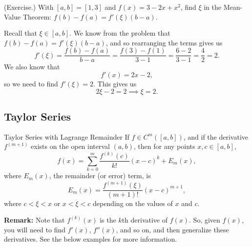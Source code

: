 \documentclass[letterpaper]{article}
\begin{document}
\begin{mdframed}
    (Exercise.) With $[a, b] = [1, 3]$ and $f(x) = 3 - 2x + x^2$, find $\xi$ in the Mean-Value Theorem: $f(b) - f(a) = f'(\xi) (b - a)$. 

    \begin{mdframed}
        Recall that $\xi \in [a, b]$. We know from the problem that $f(b) - f(a) = f'(\xi) (b - a)$, and so rearranging the terms gives us 
        \[f'(\xi) = \frac{f(b) - f(a)}{b - a} = \frac{f(3) - f(1)}{3 - 1} = \frac{6 - 2}{3 - 1} = \frac{4}{2} = 2.\] We also know that \[f'(x) = 2x - 2,\] so we need to find $f'(\xi) = 2$. This gives us \[2\xi - 2 = 2 \implies \xi = 2.\]
    \end{mdframed}
\end{mdframed}

\subsection{Taylor Series}
\begin{theorem}{Taylor Series with Lagrange Remainder}{}
    If $f \in C^m ([a, b])$, and if the derivative $f^{(m + 1)}$ exists on the open interval $(a, b)$, then for any points $x, c \in [a, b]$, 
    \[f(x) = \sum_{k = 0}^{m} \frac{f^{(k)} (c)}{k!} (x - c)^k + E_{m}(x),\] 
    where $E_{m}(x)$, the remainder (or error) term, is  
    \[E_{m}(x) = \frac{f^{(m + 1)}(\xi)}{(m + 1)!} (x - c)^{m + 1},\] 
    where $c < \xi < x$ or $x < \xi < c$ depending on the values of $x$ and $c$. 
\end{theorem}
\textbf{Remark:} Note that $f^{(k)}(x)$ is the $k$th derivative of $f(x)$. So, given $f(x)$, you will need to find $f'(x)$, $f''(x)$, and so on, and then generalize these derivatives. See the below examples for more information.
\end{document}
